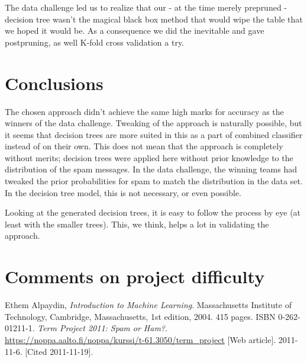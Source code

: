 \documentclass[a4paper,10pt]{article}
\begin{document}
The data challenge led us to realize that our - at the time merely
prepruned - decision tree wasn't the magical black box method
that would wipe the table that we hoped it would be.
As a consequence we did the inevitable and gave postpruning,
as well K-fold cross validation a try.


\section{Conclusions}

The chosen approach didn't achieve the same high marks for accuracy as
the winners of the data challenge.  Tweaking of the approach is
naturally possible, but it seems that decision trees are more suited in
this as a part of combined classifier instead of on their own.  This
does not mean that the approach is completely without merits; decision
trees were applied here without prior knowledge to the distribution of
the spam messages.  In the data challenge, the winning teams had tweaked
the prior probabilities for spam to match the distribution in the data
set.  In the decision tree model, this is not necessary, or even
possible.

Looking at the generated decision trees, it is easy to follow the
process by eye (at least with the smaller trees).  This, we think, helps
a lot in validating the approach.

\section{Comments on project difficulty}

\afterpage{\clearpage} %
\pagebreak
\begin{thebibliography}{9}
  Ethem Alpaydin,
  \emph{Introduction to Machine Learning}.
  Massachusetts Institute of Technology, Cambridge, Massachusetts,
  1st edition,
  2004. 415 pages. ISBN 0-262-01211-1.
  \emph{Term Project 2011: Spam or Ham?}.
  \href{https://noppa.aalto.fi/noppa/kurssi/t-61.3050/term\_project}
  {https://noppa.aalto.fi/noppa/kurssi/t-61.3050/term\_project}
  [Web article]. 2011-11-6. [Cited 2011-11-19].

\end{thebibliography}
\end{document}
